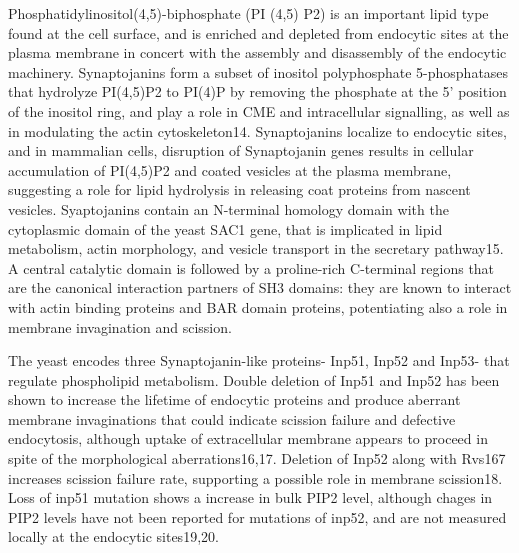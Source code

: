 	\vspace{5mm}
	Phosphatidylinositol(4,5)-biphosphate (PI (4,5) P2) is an important lipid type found at the cell surface, and is enriched and depleted from endocytic sites at the plasma membrane in concert with the assembly and disassembly of the endocytic machinery. Synaptojanins form a subset of inositol polyphosphate 5-phosphatases that hydrolyze PI(4,5)P2 to PI(4)P by removing the phosphate at the 5’ position of the inositol ring, and play a role in CME and intracellular signalling, as well as in modulating the actin cytoskeleton14. Synaptojanins localize to endocytic sites, and in mammalian cells, disruption of Synaptojanin genes results in cellular accumulation of PI(4,5)P2 and coated vesicles at the plasma membrane, suggesting a role for lipid hydrolysis in releasing coat proteins from nascent vesicles. Syaptojanins contain an N-terminal homology domain with the cytoplasmic domain of the yeast SAC1 gene, that is implicated in lipid metabolism, actin morphology, and vesicle transport in the secretary pathway15. A central catalytic domain is followed by a proline-rich C-terminal regions that are the canonical interaction partners of SH3 domains: they are known to interact with actin binding proteins and BAR domain proteins, potentiating also a role in membrane invagination and scission. 
		
	\vspace{5mm}
	The yeast encodes three Synaptojanin-like proteins- Inp51, Inp52 and Inp53- that regulate phospholipid metabolism. Double deletion of Inp51 and Inp52 has been shown to increase the lifetime of endocytic proteins and produce aberrant membrane invaginations that could indicate scission failure and defective endocytosis, although uptake of extracellular membrane appears to proceed in spite of the morphological aberrations16,17. Deletion of Inp52 along with Rvs167 increases scission failure rate, supporting a possible role in membrane scission18. Loss of inp51 mutation shows a increase in bulk PIP2 level, although chages in PIP2 levels have not been reported for mutations of inp52, and are not measured locally at the endocytic sites19,20.
		

